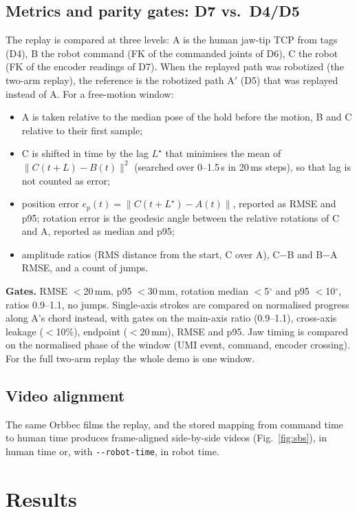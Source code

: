 \documentclass[conference,10pt]{IEEEtran}
\newcommand{\mm}{\,mm\xspace}
\begin{document}
\subsection{Metrics and parity gates: D7 vs.\ D4/D5}\label{sec:eval}
The replay is compared at three levels: A is the human jaw-tip TCP from tags (D4), B the robot command (FK of
the commanded joints of D6), C the robot (FK of the encoder readings of D7). When the replayed path was robotized (the
two-arm replay), the reference is the robotized path A$'$ (D5) that was replayed instead of A. For a free-motion window:
\begin{itemize}
\item A is taken relative to the median pose of the hold before the motion, B and C relative to their first sample;
\item C is shifted in time by the lag $L^\star$ that minimises the mean of $\lVert C(t+L)-B(t)\rVert^2$ (searched over
  0--1.5\,s in 20\,ms steps), so that lag is not counted as error;
\item position error $e_p(t)=\lVert C(t+L^\star)-A(t)\rVert$, reported as RMSE and p95; rotation error is the geodesic
  angle between the relative rotations of C and A, reported as median and p95;
\item amplitude ratios (RMS distance from the start, C over A), C$-$B and B$-$A RMSE, and a count of jumps.
\end{itemize}
\textbf{Gates.} RMSE $<$20\mm, p95 $<$30\mm, rotation median $<$5$^\circ$ and p95 $<$10$^\circ$, ratios 0.9--1.1, no jumps.
Single-axis strokes are compared on normalised progress along A's chord instead, with gates on the main-axis ratio
(0.9--1.1), cross-axis leakage ($<$10\%), endpoint ($<$20\mm), RMSE and p95. Jaw timing is compared on the normalised phase
of the window (UMI event, command, encoder crossing). For the full two-arm replay the whole demo is one window.

\subsection{Video alignment}\label{sec:video}
The same Orbbec films the replay, and the stored mapping from command time to human time produces frame-aligned
side-by-side videos (Fig.~\ref{fig:sbs}), in human time or, with \texttt{-{}-robot-time}, in robot time.

\section{Results}\label{sec:res}
\end{document}

